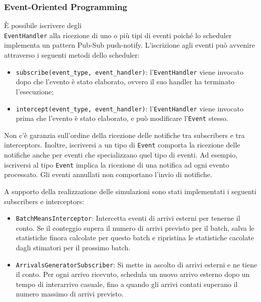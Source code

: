 \subsubsection{Event-Oriented Programming}
È possibile iscrivere degli \\ \texttt{EventHandler} alla ricezione di uno o più tipi di eventi poiché lo scheduler implementa un pattern Pub-Sub push-notify. L'iscrizione agli eventi può avvenire attraverso i seguenti metodi dello scheduler:
\begin{itemize}
    \item \texttt{subscribe(event\_type, event\_handler)}: l'\texttt{EventHandler} viene invocato dopo che l'evento è stato elaborato, ovvero il suo handler ha terminato l'esecuzione;
    \item \texttt{intercept(event\_type, event\_handler)}: l'\texttt{EventHandler} viene invocato prima che l'evento è stato elaborato, e può modificare l'\texttt{Event} stesso.
\end{itemize}
Non c'è garanzia sull'ordine della ricezione delle notifiche tra subscribers e tra interceptors. Inoltre, iscriversi a un tipo di \texttt{Event} comporta la ricezione delle notifiche anche per eventi che specializzano quel tipo di eventi. Ad esempio, iscriversi al tipo \texttt{Event} implica la ricezione di una notifica ad ogni evento processato. Gli eventi annullati non comportano l'invio di notifiche.

A supporto della realizzazione delle simulazioni sono stati implementati i seguenti subscribers e interceptors:
\begin{itemize}
    \item \texttt{BatchMeansInterceptor}: Intercetta eventi di arrivi esterni per tenerne il conto. Se il conteggio supera il numero di arrivi previsto per il batch, salva le statistiche finora calcolate per questo batch e ripristina le statistiche cacolate dagli stimatori per il prossimo batch.
    \item \texttt{ArrivalsGeneratorSubscriber}: Si mette in ascolto di arrivi esterni e ne tiene il conto. Per ogni arrivo ricevuto, schedula un nuovo arrivo esterno dopo un tempo di interarrivo casuale, fino a quando gli arrivi contati superano il numero massimo di arrivi previsto.
\end{itemize}

